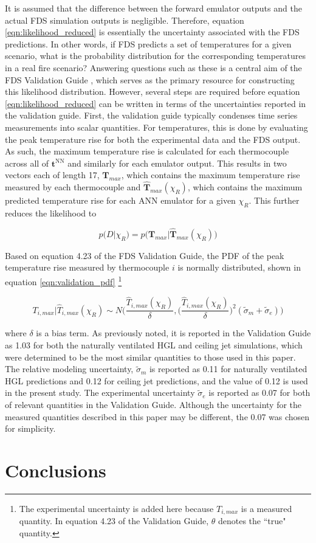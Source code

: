 \documentclass{article}
\begin{document}
It is assumed that the difference between the forward emulator outputs and the actual FDS simulation outputs is negligible. Therefore, equation \ref{eqn:likelihood_reduced} is essentially the uncertainty associated with the FDS predictions. In other words, if FDS predicts a set of temperatures for a given scenario, what is the probability distribution for the corresponding temperatures in a real fire scenario? Answering questions such as these is a central aim of the FDS Validation Guide \cite{mcgrattan2020fire}, which serves as the primary resource for constructing this likelihood distribution. However, several steps are required before equation \ref{eqn:likelihood_reduced} can be written in terms of the uncertainties reported in the validation guide. First, the validation guide typically condenses time series measurements into scalar quantities. For temperatures, this is done by evaluating the peak temperature rise for both the experimental data and the FDS output. As such, the maximum temperature rise is calculated for each thermocouple across all of $\boldsymbol{t}^\text{NN}$ and similarly for each emulator output. This results in two vectors each of length 17, $\boldsymbol{T}_{max}$, which contains the maximum temperature rise measured by each thermocouple and $\boldsymbol{\hat{T}}_{max}(\chi_R)$, which contains the maximum predicted temperature rise for each ANN emulator for a given $\chi_R$. This further reduces the likelihood to 

 \begin{equation}
  \label{eqn:likelihood_reduced}
  p\big(D\big|\chi_R\big) = p\bigg(\boldsymbol{T}_{max} \bigg| \boldsymbol{\hat{T}}_{max}(\chi_R)\bigg)
\end{equation}

Based on equation 4.23  of the FDS Validation Guide, the PDF of the peak temperature rise measured by thermocouple $i$ is normally distributed, shown in equation \ref{eqn:validation_pdf} \footnote{The experimental uncertainty is added here because $T_{i,max}$ is a measured quantity. In equation 4.23 of the Validation Guide, $\theta$ denotes the ``true" quantity.} 

 \begin{equation}
  \label{eqn:validation_pdf}
  T_{i,max} \big| \hat{T}_{i,max}(\chi_R) \sim N\Bigg( \frac{\hat{T}_{i,max}(\chi_R)}{\delta} ,   \bigg( \frac{\hat{T}_{i,max}(\chi_R)}{\delta} \bigg)^2(\tilde{\sigma}_m + \tilde{\sigma}_e) \Bigg)
\end{equation}

\noindent where $\delta$ is a bias term. As previously noted, it is reported in the Validation Guide as 1.03 for both the naturally ventilated HGL and ceiling jet simulations, which were determined to be the most similar quantities to those used in this paper. The relative modeling uncertainty, $\tilde{\sigma}_m$ is reported as 0.11 for naturally ventilated HGL predictions and 0.12 for ceiling jet predictions, and the value of 0.12 is used in the present study. The experimental uncertainty $\tilde{\sigma}_e$ is reported as 0.07 for both of relevant quantities in the Validation Guide. Although the uncertainty for the measured quantities described in this paper may be different, the 0.07 was chosen for simplicity. 



\section{Conclusions}


\clearpage


\end{document}
